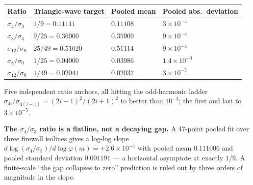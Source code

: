 \documentclass[
  11pt,
]{article}
\newcounter{none} %
\begin{document}
{\def\LTcaptype{none} %
\begin{longtable}[]{@{}
  >{\raggedright\arraybackslash}p{}
  >{\raggedleft\arraybackslash}p{}
  >{\raggedleft\arraybackslash}p{}
  >{\raggedleft\arraybackslash}p{}@{}}
\toprule\noalign{}
\begin{minipage}[b]{\linewidth}\raggedright
Ratio
\end{minipage} & \begin{minipage}[b]{\linewidth}\raggedleft
Triangle-wave target
\end{minipage} & \begin{minipage}[b]{\linewidth}\raggedleft
Pooled mean
\end{minipage} & \begin{minipage}[b]{\linewidth}\raggedleft
Pooled abs.~deviation
\end{minipage} \\
\midrule\noalign{}
\endhead
\bottomrule\noalign{}
\endlastfoot
\(\sigma_4/\sigma_3\) & \(1/9 = 0.11111\) & \(0.11108\) &
\(3 \times 10^{-5}\) \\
\(\sigma_8/\sigma_4\) & \(9/25 = 0.36000\) & \(0.35909\) &
\(9 \times 10^{-4}\) \\
\(\sigma_{12}/\sigma_8\) & \(25/49 = 0.51020\) & \(0.51114\) &
\(9 \times 10^{-4}\) \\
\(\sigma_8/\sigma_0\) & \(1/25 = 0.04000\) & \(0.03986\) &
\(1.4 \times 10^{-4}\) \\
\(\sigma_{12}/\sigma_0\) & \(1/49 = 0.02041\) & \(0.02037\) &
\(3 \times 10^{-5}\) \\
\end{longtable}
}

Five independent ratio anchors, all hitting the odd-harmonic ladder
\(\sigma_{4i}/\sigma_{4(i-1)} = (2i-1)^2/(2i+1)^2\) to better than
\(10^{-3}\); the first and last to \(3 \times 10^{-5}\).

\textbf{The \(\sigma_4/\sigma_3\) ratio is a flatline, not a decaying
gap.} A 47-point pooled fit over three firewall isolines gives a log-log
slope
\(d \log(\sigma_4/\sigma_3) / d \log \varphi(m) = +2.6 \times 10^{-4}\)
with pooled mean \(0.111006\) and pooled standard deviation \(0.001191\)
--- a horizontal asymptote at exactly \(1/9\). A finite-scale ``the gap
collapses to zero'' prediction is ruled out by three orders of magnitude
in the slope.
\end{document}
